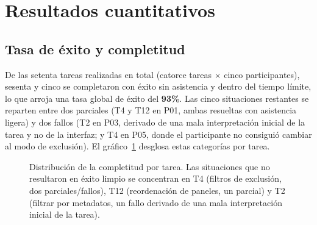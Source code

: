 \section{Resultados cuantitativos}
\label{sec:resultadosCuantitativos}

\subsection{Tasa de éxito y completitud}

De las setenta tareas realizadas en total (catorce tareas $\times$ cinco participantes),
sesenta y cinco se completaron con éxito sin asistencia y dentro del tiempo límite, lo que
arroja una tasa global de éxito del \textbf{93\%}. Las cinco situaciones restantes se reparten
entre dos parciales (T4 y T12 en P01, ambas resueltas con asistencia ligera) y dos fallos
(T2 en P03, derivado de una mala interpretación inicial de la tarea y no de la interfaz; y
T4 en P05, donde el participante no consiguió cambiar al modo de exclusión). El
gráfico~\ref{fig:tasaExitoTareas} desglosa estas categorías por tarea.

\begin{figure}[H]
\centering
{}
\caption[Distribución de la completitud por tarea]{Distribución de la completitud por tarea. Las situaciones que no resultaron en éxito
limpio se concentran en T4 (filtros de exclusión, dos parciales/fallos), T12 (reordenación
de paneles, un parcial) y T2 (filtrar por metadatos, un fallo derivado de una mala
interpretación inicial de la tarea).}
\label{fig:tasaExitoTareas}
\end{figure}

